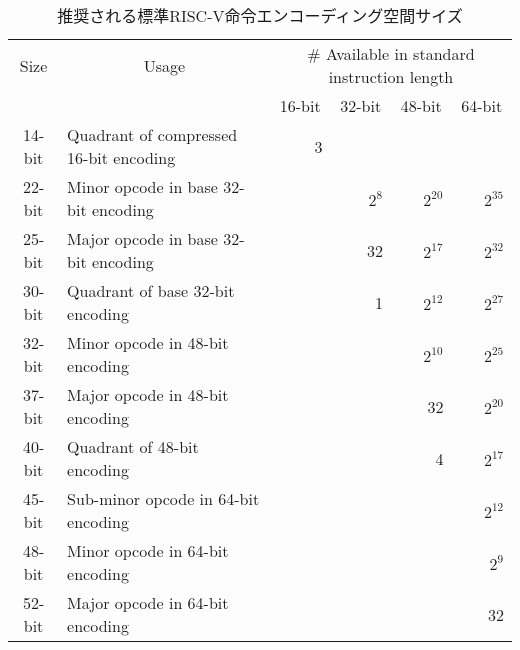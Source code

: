 \begin{table}[H]
\begin{center}
\begin{tabular}{|c|l|r|r|r|r|}
\hline
\multicolumn{1}{|c|}{Size} & \multicolumn{1}{|c|}{Usage} &
\multicolumn{4}{|c|}{\# Available in standard instruction length} \\ \cline{3-6}
 & &
\multicolumn{1}{|c|}{16-bit} &
\multicolumn{1}{|c|}{32-bit} &
\multicolumn{1}{|c|}{48-bit} &
\multicolumn{1}{|c|}{64-bit} \\ \hline \hline
14-bit & Quadrant of compressed 16-bit encoding & 3       &         &         &         \\ \hline \hline
22-bit & Minor opcode in base 32-bit encoding   &         & $2^{8}$ & $2^{20}$ & $2^{35}$ \\ \hline
25-bit & Major opcode in base 32-bit encoding   &         &      32 & $2^{17}$ & $2^{32}$ \\ \hline
30-bit & Quadrant of base 32-bit encoding       &         &       1 & $2^{12}$ & $2^{27}$ \\ \hline \hline
32-bit & Minor opcode in 48-bit encoding        &         &         & $2^{10}$ & $2^{25}$ \\ \hline
37-bit & Major opcode in 48-bit encoding        &         &         &       32 & $2^{20}$ \\ \hline
40-bit & Quadrant of 48-bit encoding            &         &         &        4 & $2^{17}$ \\ \hline \hline
45-bit & Sub-minor opcode in 64-bit encoding    &         &         &          & $2^{12}$ \\ \hline
48-bit & Minor opcode in 64-bit encoding        &         &         &          & $2^{9}$  \\ \hline
52-bit & Major opcode in 64-bit encoding        &         &         &          &      32\\ \hline
\end{tabular}
\end{center}
\begin{comment}
\caption{Suggested standard RISC-V instruction encoding space sizes.}
\end{comment}
\caption{推奨される標準RISC-V命令エンコーディング空間サイズ}
\label{encodingspaces}
\end{table}

\vspace{-0.2in}
\begin{comment}
\subsection*{Greenfield versus Brownfield Extensions}
\end{comment}
